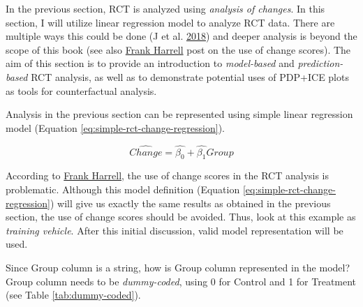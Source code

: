 \documentclass[
]{book}
\begin{document}
In the previous section, RCT is analyzed using \emph{analysis of changes}. In this section, I will utilize linear regression model to analyze RCT data. There are multiple ways this could be done (J et al. \protect\hyperlink{ref-jDifferentWaysEstimate2018}{2018}) and deeper analysis is beyond the scope of this book (see also \href{https://www.fharrell.com/post/errmed/\#change}{Frank Harrell} post on the use of change scores). The aim of this section is to provide an introduction to \emph{model-based} and \emph{prediction-based} RCT analysis, as well as to demonstrate potential uses of PDP+ICE plots as tools for counterfactual analysis.

Analysis in the previous section can be represented using simple linear regression model (Equation \eqref{eq:simple-rct-change-regression}).

\begin{equation}
  \widehat{Change} = \hat{\beta_0} + \hat{\beta_1}Group
  \label{eq:simple-rct-change-regression}
\end{equation}

According to \href{https://www.fharrell.com/post/errmed/\#change}{Frank Harrell}, the use of change scores in the RCT analysis is problematic. Although this model definition (Equation \eqref{eq:simple-rct-change-regression}) will give us exactly the same results as obtained in the previous section, the use of change scores should be avoided. Thus, look at this example as \emph{training vehicle}. After this initial discussion, valid model representation will be used.

Since Group column is a string, how is Group column represented in the model? Group column needs to be \emph{dummy-coded}, using 0 for Control and 1 for Treatment (see Table \ref{tab:dummy-coded}).
\end{document}
